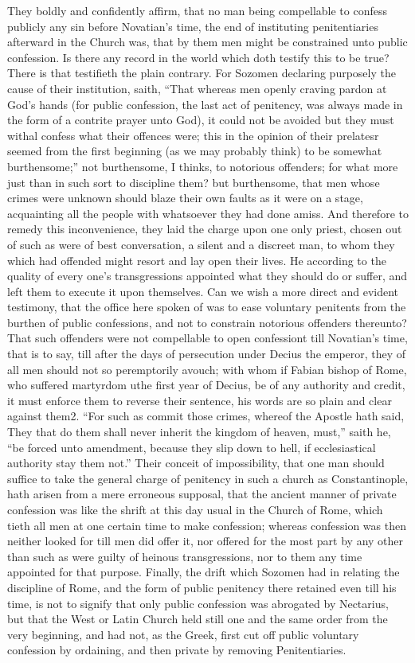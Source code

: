 They boldly and confidently affirm, that no man being compellable to confess publicly any sin before Novatian’s time, the end of instituting penitentiaries afterward in the Church was, that by them men might be constrained unto public confession. Is there any record in the world which doth testify this to be true? There is that testifieth the plain contrary. For Sozomen  declaring purposely the cause of their institution, saith, “That whereas men openly craving pardon at God’s hands (for public confession, the last act of penitency, was always made in the form of a contrite prayer unto God), it could not be avoided but they must withal confess what their offences were; this in the opinion of their prelatesr seemed from the first beginning (as we may probably think) to be somewhat burthensome;” not burthensome, I thinks, to notorious offenders; for what more just than in such sort to discipline them? but burthensome, that men whose crimes were unknown should blaze their own faults as it were on a stage, acquainting all the people with whatsoever they had done amiss. And therefore to remedy this inconvenience, they laid the charge upon one only priest, chosen out of such as were of best conversation, a silent and a discreet man, to whom they which had offended might resort and lay open their lives. He according to the quality of every one’s transgressions appointed what they should do or suffer, and left them to execute it upon themselves. Can we wish a more direct and evident testimony, that the office here spoken of was to ease voluntary penitents from the burthen of public confessions, and not to constrain notorious offenders thereunto? That such offenders were not compellable to open confessiont till Novatian’s time, that is to say, till after the days of persecution under Decius the emperor, they of all men should not so peremptorily avouch; with whom if Fabian bishop of Rome, who suffered martyrdom uthe first year of Decius, be of any authority and credit, it must enforce them to reverse their sentence, his words are so plain and clear against them2. “For such as commit those crimes, whereof the Apostle hath said, They that do them shall never inherit the kingdom of heaven,  must,” saith he, “be forced unto amendment, because they slip down to hell, if ecclesiastical authority stay them not.” Their conceit of impossibility, that one man should suffice to take the general charge of penitency in such a church as Constantinople, hath arisen from a mere erroneous supposal, that the ancient manner of private confession was like the shrift at this day usual in the Church of Rome, which tieth all men at one certain time to make confession; whereas confession was then neither looked for till men did offer it, nor offered for the most part by any other than such as were guilty of heinous transgressions, nor to them any time appointed for that purpose. Finally, the drift which Sozomen had in relating the discipline of Rome, and the form of public penitency there retained even till his time, is not to signify that only public confession was abrogated by Nectarius, but that the West or Latin Church held still one and the same order from the very beginning, and had not, as the Greek, first cut off public voluntary confession by ordaining, and then private by removing Penitentiaries.


